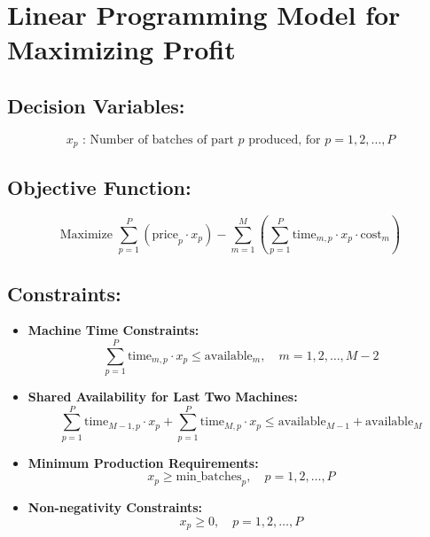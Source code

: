 \documentclass{article}
\begin{document}
\section*{Linear Programming Model for Maximizing Profit}

\subsection*{Decision Variables:}
\[
x_p \text{ : Number of batches of part } p \text{ produced, for } p = 1, 2, \ldots, P
\]

\subsection*{Objective Function:}
\[
\text{Maximize } \sum_{p=1}^{P} (\text{price}_{p} \cdot x_p) - \sum_{m=1}^{M} \left( \sum_{p=1}^{P} \text{time}_{m,p} \cdot x_p \cdot \text{cost}_{m} \right)
\]

\subsection*{Constraints:}

\begin{itemize}
    \item \textbf{Machine Time Constraints:}
    \[
    \sum_{p=1}^{P} \text{time}_{m,p} \cdot x_p \leq \text{available}_{m}, \quad m = 1, 2, \ldots, M-2
    \]

    \item \textbf{Shared Availability for Last Two Machines:}
    \[
    \sum_{p=1}^{P} \text{time}_{M-1,p} \cdot x_p + \sum_{p=1}^{P} \text{time}_{M,p} \cdot x_p \leq \text{available}_{M-1} + \text{available}_{M}
    \]

    \item \textbf{Minimum Production Requirements:}
    \[
    x_p \geq \text{min_batches}_{p}, \quad p = 1, 2, \ldots, P
    \]

    \item \textbf{Non-negativity Constraints:}
    \[
    x_p \geq 0, \quad p = 1, 2, \ldots, P
    \]
\end{itemize}
\end{document}
